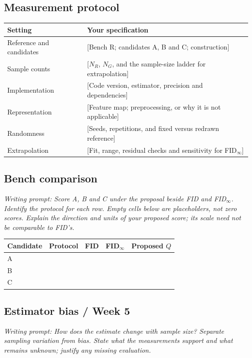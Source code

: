 \documentclass[11pt,a4paper]{article}
\newcommand{\prompt}[1]{{\small\color{PromptGrey}\textit{Writing prompt: #1}\par}}
\newcommand{\blank}{\textemdash}
\begin{document}
\subsection{Measurement protocol}
\begin{tabularx}{\linewidth}{@{}lX@{}}
\toprule
Setting & Your specification \\
\midrule
Reference and candidates & [Bench R; candidates A, B and C; construction] \\
Sample counts & [$N_R$, $N_G$, and the sample-size ladder for extrapolation] \\
Implementation & [Code version, estimator, precision and dependencies] \\
Representation & [Feature map; preprocessing, or why it is not applicable] \\
Randomness & [Seeds, repetitions, and fixed versus redrawn reference] \\
Extrapolation & [Fit, range, residual checks and sensitivity for FID$_\infty$] \\
\bottomrule
\end{tabularx}

\subsection{Bench comparison}
\prompt{Score A, B and C under the proposal beside FID and FID$_\infty$.
Identify the protocol for each row. Empty cells below are placeholders, not
zero scores. Explain the direction and units of your proposed score; its scale
need not be comparable to FID's.}
\begin{center}
\begin{tabularx}{\linewidth}{@{}lXXXX@{}}
\toprule
Candidate & Protocol & FID & FID$_\infty$ & Proposed $Q$ \\
\midrule
A & \blank & \blank & \blank & \blank \\
B & \blank & \blank & \blank & \blank \\
C & \blank & \blank & \blank & \blank \\
\bottomrule
\end{tabularx}
\end{center}

\subsection{Estimator bias / Week 5}
\prompt{How does the estimate change with sample size? Separate sampling
variation from bias. State what the measurements support and what remains
unknown; justify any missing evaluation.}
\end{document}
